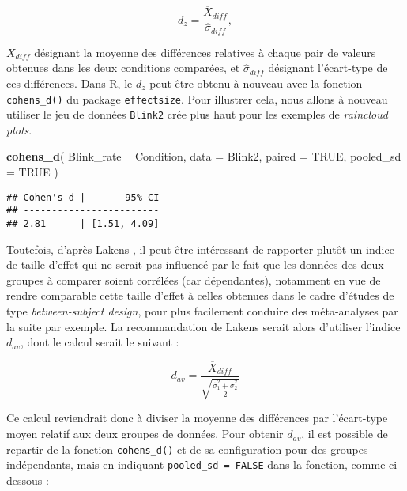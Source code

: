 \documentclass[
  french,
]{book}
\newenvironment{Shaded}{\begin{snugshade}}{\end{snugshade}}
\newcommand{\DataTypeTok}[1]{\textcolor[rgb]{0.13,0.29,0.53}{#1}}
\newcommand{\KeywordTok}[1]{\textcolor[rgb]{0.13,0.29,0.53}{\textbf{#1}}}
\newcommand{\NormalTok}[1]{#1}
\newcommand{\OperatorTok}[1]{\textcolor[rgb]{0.81,0.36,0.00}{\textbf{#1}}}
\newcommand{\OtherTok}[1]{\textcolor[rgb]{0.56,0.35,0.01}{#1}}
\newcommand{\StringTok}[1]{\textcolor[rgb]{0.31,0.60,0.02}{#1}}
\begin{document}
\[d_{z} = \frac{\overline{X} _{diff}}{\hat{\sigma}_{diff}},\]

\(\overline{X}_{diff}\) désignant la moyenne des différences relatives à chaque pair de valeurs obtenues dans les deux conditions comparées, et \(\hat{\sigma}_{diff}\) désignant l'écart-type de ces différences. Dans R, le \(d_{z}\) peut être obtenu à nouveau avec la fonction \texttt{cohens\_d()} du package \texttt{effectsize}. Pour illustrer cela, nous allons à nouveau utiliser le jeu de données \texttt{Blink2} crée plus haut pour les exemples de \emph{raincloud plots}.

\begin{Shaded}
\begin{Highlighting}[]
\KeywordTok{cohens_d}\NormalTok{(}
\NormalTok{  Blink_rate }\OperatorTok{~}\StringTok{ }\NormalTok{Condition, }
  \DataTypeTok{data =}\NormalTok{ Blink2, }
  \DataTypeTok{paired =} \OtherTok{TRUE}\NormalTok{, }
  \DataTypeTok{pooled_sd =} \OtherTok{TRUE}
\NormalTok{  )}
\end{Highlighting}
\end{Shaded}

\begin{verbatim}
## Cohen's d |       95% CI
## ------------------------
## 2.81      | [1.51, 4.09]
\end{verbatim}

Toutefois, d'après Lakens \autocite*{lakensCalculatingReportingEffect2013}, il peut être intéressant de rapporter plutôt un indice de taille d'effet qui ne serait pas influencé par le fait que les données des deux groupes à comparer soient corrélées (car dépendantes), notamment en vue de rendre comparable cette taille d'effet à celles obtenues dans le cadre d'études de type \emph{between-subject design}, pour plus facilement conduire des méta-analyses par la suite par exemple. La recommandation de Lakens \autocite*{lakensCalculatingReportingEffect2013} serait alors d'utiliser l'indice \(d_{av}\), dont le calcul serait le suivant :

\[d_{av} = \frac{\overline{X} _{diff}}{\sqrt{\frac{\hat{\sigma}_{1}^2 + \hat{\sigma}_{2}^2} {2}}}\]

Ce calcul reviendrait donc à diviser la moyenne des différences par l'écart-type moyen relatif aux deux groupes de données. Pour obtenir \(d_{av}\), il est possible de repartir de la fonction \texttt{cohens\_d()} et de sa configuration pour des groupes indépendants, mais en indiquant \texttt{pooled\_sd\ =\ FALSE} dans la fonction, comme ci-dessous :
\end{document}
